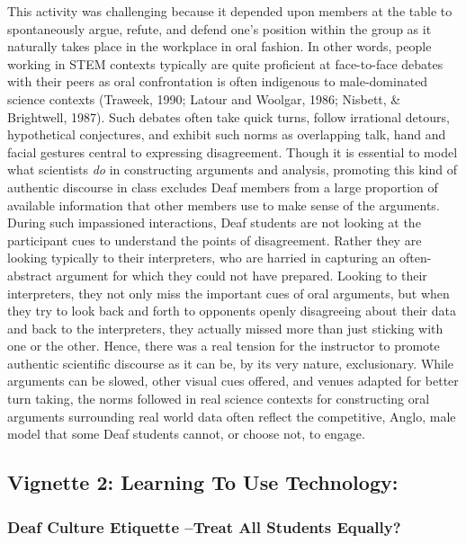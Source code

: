 \documentclass[11.5pt]{sig-alternate} %
\begin{document}
\begin{large}
This activity was challenging because it depended upon members at the table to spontaneously argue, refute, and defend one’s position within the group as it naturally takes place in the workplace in oral fashion.  In other words, people working in STEM contexts typically are quite proficient at face-to-face debates with their peers as oral confrontation is often indigenous to male-dominated science contexts (Traweek, 1990; Latour and Woolgar, 1986; Nisbett, \& Brightwell, 1987).  Such debates often take quick turns, follow irrational detours, hypothetical conjectures, and exhibit such norms as overlapping talk, hand and facial gestures central to expressing disagreement. Though it is essential to model what scientists \textit{do} in constructing arguments and analysis, promoting this kind of authentic discourse in class excludes Deaf members from a large proportion of available information that other members use to make sense of the arguments. During such impassioned interactions, Deaf students are not looking at the participant cues to understand the points of disagreement. Rather they are looking typically to their interpreters, who are harried in capturing an often-abstract argument for which they could not have prepared. Looking to their interpreters, they not only miss the important cues of oral arguments, but when they try to look back and forth to opponents openly disagreeing about their data and back to the interpreters, they actually missed more than just sticking with one or the other.  Hence, there was a real tension for the instructor to promote authentic scientific discourse as it can be, by its very nature, exclusionary.  While arguments can be slowed, other visual cues offered, and venues adapted for better turn taking, the norms followed in real science contexts for constructing oral arguments surrounding real world data often reflect the competitive, Anglo, male model that some Deaf students cannot, or choose not, to engage.

\subsection*{Vignette 2: Learning To Use Technology: }
  
\subsubsection*{Deaf Culture Etiquette –Treat All Students Equally?}


\end{large}
\end{document}
